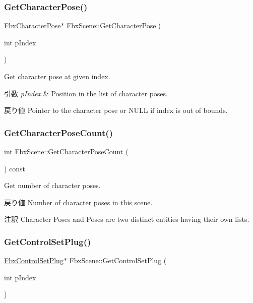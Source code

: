 \subsubsection{\texorpdfstring{Get\+Character\+Pose()}{GetCharacterPose()}}
{\footnotesize\ttfamily \hyperlink{class_fbx_character_pose}{Fbx\+Character\+Pose}$\ast$ Fbx\+Scene\+::\+Get\+Character\+Pose (\begin{DoxyParamCaption}\item[{int}]{p\+Index }\end{DoxyParamCaption})}

Get character pose at given index. 
\begin{DoxyParams}{引数}
{\em p\+Index} & Position in the list of character poses. \\
\hline
\end{DoxyParams}
\begin{DoxyReturn}{戻り値}
Pointer to the character pose or {\ttfamily N\+U\+LL} if index is out of bounds. 
\end{DoxyReturn}
\mbox{\label{class_fbx_scene_a172e1ef47648e5271fc5f7c19e66692f}} 
\subsubsection{\texorpdfstring{Get\+Character\+Pose\+Count()}{GetCharacterPoseCount()}}
{\footnotesize\ttfamily int Fbx\+Scene\+::\+Get\+Character\+Pose\+Count (\begin{DoxyParamCaption}{ }\end{DoxyParamCaption}) const}

Get number of character poses. \begin{DoxyReturn}{戻り値}
Number of character poses in this scene. 
\end{DoxyReturn}
\begin{DoxyRemark}{注釈}
Character Poses and Poses are two distinct entities having their own lists. 
\end{DoxyRemark}
\mbox{\label{class_fbx_scene_aaa152051d6af46baf4e56fc517d7fe19}} 
\subsubsection{\texorpdfstring{Get\+Control\+Set\+Plug()}{GetControlSetPlug()}}
{\footnotesize\ttfamily \hyperlink{class_fbx_control_set_plug}{Fbx\+Control\+Set\+Plug}$\ast$ Fbx\+Scene\+::\+Get\+Control\+Set\+Plug (\begin{DoxyParamCaption}\item[{int}]{p\+Index }\end{DoxyParamCaption})}

